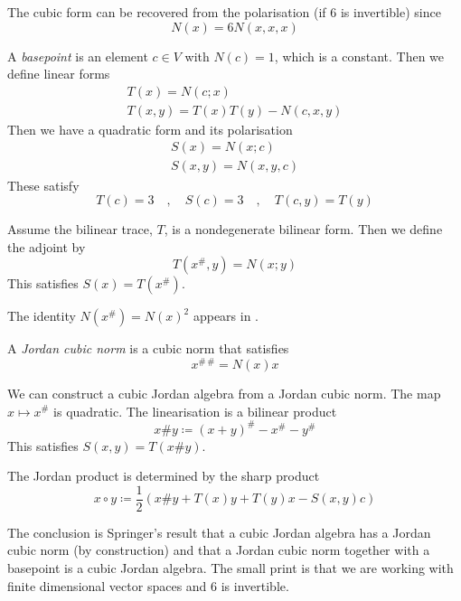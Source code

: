 \documentclass[12pt]{amsart}
\newcommand{\Dfn}[1]{\emph{\color{blue}#1}}
\begin{document}
The cubic form can be recovered from the polarisation (if 6 is invertible) since
\begin{equation*}
	N(x) = 6N(x,x,x)
\end{equation*}

A \Dfn{basepoint} is an element $c\in V$ with $N(c)=1$, which is a constant.
Then we define linear forms
\begin{gather*}
	T(x) = N(c;x) \\
T(x,y) = T(x)T(y) - N(c,x,y)
\end{gather*}
Then we have a quadratic form and its polarisation
\begin{gather*}
	S(x) = N(x;c) \\
	S(x,y) = N(x,y,c)
\end{gather*}
These satisfy
\begin{equation*}
	T(c)=3 \quad,\quad S(c)=3 \quad,\quad T(c,y) = T(y)
\end{equation*}

Assume the bilinear trace, $T$, is a nondegenerate bilinear form. Then we define the adjoint by
\begin{equation*}
	T(x^\#,y) = N(x;y)
\end{equation*}
This satisfies $S(x) = T(x^\#)$.

The identity $N(x^\#) = N(x)^2$ appears in \cite[Problem~4.5]{mccrimmon2004}.

A \Dfn{Jordan cubic norm} is a cubic norm that satisfies
\begin{equation*}
	x^{\#\,\#} = N(x)x
\end{equation*}

We can construct a cubic Jordan algebra from a Jordan cubic norm.
The map $x\mapsto x^\#$ is quadratic. The linearisation is a bilinear product
\begin{equation*}
	x\# y \coloneqq (x+y)^\# - x^\# - y^\#
\end{equation*}
This satisfies $S(x,y) = T(x\# y)$.

The Jordan product is determined by the sharp product
\begin{equation*}
	x \circ y \coloneqq \frac12 \left(x\# y + T(x)y + T(y)x - S(x,y)c \right)
\end{equation*}

The conclusion is Springer's result that a cubic Jordan algebra has a Jordan cubic norm
(by construction) and that a Jordan cubic norm together with a basepoint is a cubic Jordan algebra.
The small print is that we are working with finite dimensional vector spaces and 6 is invertible.
\end{document}
